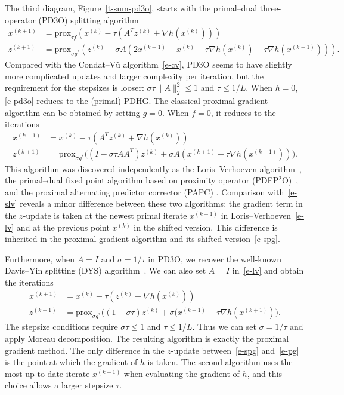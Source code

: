 \documentclass[letterpaper,11pt]{article}
\newcommand{\prox}{\mathrm{prox}}
\begin{document}
The third diagram, Figure~\ref{t-sum-pd3o}, starts with the
primal--dual three-operator (PD3O) splitting algorithm~\cite{Yan18}
\begin{subequations} \label{e-pd3o}
\begin{align}
  x^{(k+1)} &= \prox_{\tau f} (x^{(k)}-
    \tau (A^Tz^{(k)}+\nabla h(x^{(k)}))) \\
  z^{(k+1)} &= \prox_{\sigma g^\ast}
    (z^{(k)}+\sigma A(2x^{(k+1)}-x^{(k)}+\tau \nabla h(x^{(k)})
    -\tau \nabla h(x^{(k+1)}))).
\end{align}
\end{subequations}
Compared with the Condat--V\~u algorithm~\eqref{e-cv},
PD3O seems to have slightly more complicated updates and
larger complexity per iteration,
but the requirement for the stepsizes is looser:
$\sigma \tau \|A\|_2^2 \leq 1$ and $\tau \leq 1/L$.
When $h=0$, \eqref{e-pd3o} reduces to the (primal) PDHG.
The classical proximal gradient algorithm can be obtained by setting $g=0$.
When $f=0$, it reduces to the iterations%
\begin{subequations} \label{e-lv}
\begin{align}
  x^{(k+1)} &= x^{(k)}-\tau(A^Tz^{(k)}+\nabla h(x^{(k)})) \\
  z^{(k+1)} &= \prox_{\sigma g^\ast}
    \big((I-\sigma \tau AA^T)z^{(k)}
      +\sigma A(x^{(k+1)}-\tau \nabla h(x^{(k+1)})) \big).
\end{align}
\end{subequations}
This algorithm was discovered independently as
the Loris--Verhoeven algorithm~\cite{LV11},
the primal--dual fixed point algorithm
based on proximity operator (PDFP$^2$O)~\cite{CHZ13},
and the proximal alternating predictor corrector (PAPC) \cite{DST15}.
Comparison with~\eqref{e-slv} reveals a minor difference
between these two algorithms:
the gradient term in the $z$-update is taken at the newest primal
iterate $x^{(k+1)}$ in Loris--Verhoeven~\eqref{e-lv}
and at the previous point $x^{(k)}$ in the shifted version.
This difference is inherited in the proximal gradient algorithm
and its shifted version~\eqref{e-spg}.

Furthermore, when $A=I$ and $\sigma=1/\tau$ in PD3O, we recover
the well-known Davis--Yin splitting (DYS) algorithm~\cite{DY15}.
We can also set $A=I$ in~\eqref{e-lv} and obtain the iterations
\begin{subequations} \label{e-pg}
\begin{align}
  x^{(k+1)} &= x^{(k)}-\tau(z^{(k)}+\nabla h(x^{(k)})) \\
  z^{(k+1)} &= \prox_{\sigma g^\ast} \big(
    (1-\sigma\tau)z^{(k)}+\sigma(x^{(k+1)}-\tau \nabla h(x^{(k+1)})\big).
\end{align}
\end{subequations}
The stepsize conditions require $\sigma\tau \leq 1$ and $\tau \leq 1/L$.
Thus we can set $\sigma=1/\tau$ and apply Moreau decomposition.
The resulting algorithm is exactly the proximal gradient method.
The only difference in the $z$-update
between~\eqref{e-spg} and~\eqref{e-pg} is
the point at which the gradient of $h$ is taken.
The second algorithm uses the most up-to-date iterate $x^{(k+1)}$
when evaluating the gradient of $h$, and this choice allows a larger 
stepsize $\tau$.
\end{document}
